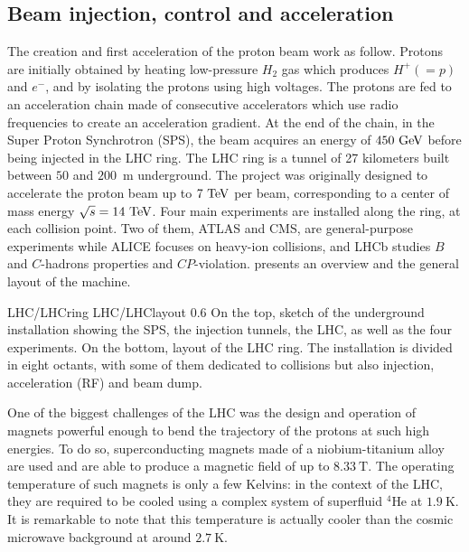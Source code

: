    \subsection{Beam injection, control and acceleration}

    The creation and first acceleration of the proton beam work as follow. Protons are initially
    obtained by heating low-pressure $H_2$ gas which produces $H^+ (= p)$ and $e^-$, and
    by isolating the protons using high voltages. The protons are fed to an acceleration
    chain made of consecutive accelerators which use radio frequencies to create an acceleration
    gradient. At the end of the chain, in the Super Proton Synchrotron (SPS), the
    beam acquires an energy of $450~\text{GeV}$ before being injected in the LHC ring. The LHC
    ring is a tunnel of 27 kilometers built between $50$ and $200$~m underground. The
    project was originally designed to accelerate the proton beam up to $7~\text{TeV}$ per beam,
    corresponding to a center of mass energy $\sqrt{s} = 14~\text{TeV}$. Four main experiments are
    installed along the ring, at each collision point. Two of them, ATLAS and CMS, are
    general-purpose experiments while ALICE focuses on heavy-ion collisions, and LHCb studies
    $B$ and $C$-hadrons properties and $CP$-violation.  presents an
    overview and the general layout of the machine.

                     {LHC/LHCring}
                     {LHC/LHClayout}
                     {0.6}
                     {On the top, sketch of the underground installation showing the SPS,
                     the injection tunnels, the LHC, as well as the four experiments. On
                     the bottom, layout of the LHC ring. The installation is divided in
                     eight octants, with some of them dedicated to collisions but also
                     injection, acceleration (RF) and beam dump.}

    One of the biggest challenges of the LHC was the design and operation of magnets
    powerful enough to bend the trajectory of the protons at such high energies. To do
    so, superconducting magnets made of a niobium-titanium alloy are used and are able to
    produce a magnetic field of up to $8.33~\text{T}$. The operating temperature of such magnets
    is only a few Kelvins: in the context of the LHC, they are required to be cooled using
    a complex system of superfluid $^4$He at $1.9~\text{K}$. It is remarkable to note that this
    temperature is actually cooler than the cosmic microwave background at around $2.7~\text{K}$.

